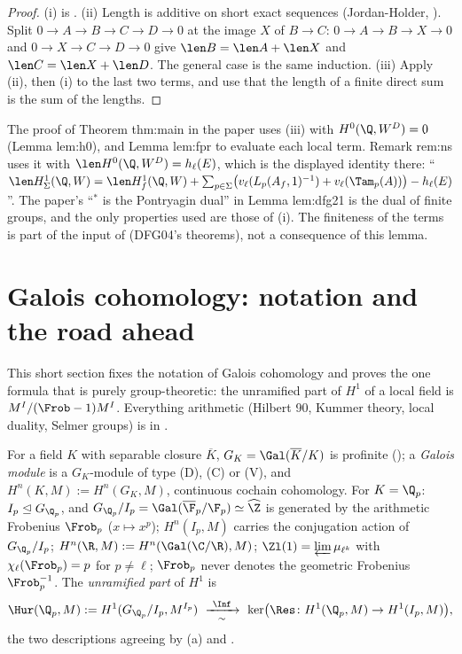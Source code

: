 \begin{proof}
(i) is . (ii) Length is additive on short exact sequences (Jordan-Holder, ). Split $0\to A\to B\to C\to D\to0$ at the image $X$ of $B\to C$:
$0\to A\to B\to X\to0$ and $0\to X\to C\to D\to0$ give $\len B=\len A+\len X$ and $\len C=\len X+\len D$. The general case is the same induction. (iii) Apply (ii), then (i) to the
last two terms, and use that the length of a finite direct sum is the sum of the lengths.
\end{proof}

\begin{paperlink}\label{pl:cohomology:lengths}
The proof of Theorem thm:main in the paper uses (iii) with $H^0(\Q,W^D)=0$ (Lemma lem:h0), and Lemma lem:fpr to evaluate each local term. Remark rem:ns uses it with
$\len H^0(\Q,W^D)=h_\ell(E)$, which is the displayed identity there: ``$\len H^1_\Sigma(\Q,W)=\len H^1_f(\Q,W)+\sum_{p\in\Sigma}\bigl(v_\ell(L_p(A_f,1)^{-1})+v_\ell(\Tam_p(A))\bigr)-h_\ell(E)$''. The paper's
``$^*$ is the Pontryagin dual'' in Lemma lem:dfg21 is the dual of finite groups, and the only properties used are those of (i). The finiteness of the terms is
part of the input of  (DFG04's theorems), not a consequence of this lemma.
\end{paperlink}

\section{Galois cohomology: notation and the road ahead}\label{sec:cohomology:galois}

This short section fixes the notation of Galois cohomology and proves the one formula that is purely group-theoretic: the unramified part of $H^1$ of a
local field is $M^{I}/(\Frob-1)M^I$. Everything arithmetic (Hilbert 90, Kummer theory, local duality, Selmer groups) is in .

\begin{convention}\label{conv:cohomology:galois}
For a field $K$ with separable closure $\overline K$, $G_K=\Gal(\overline K/K)$ is profinite (); a \emph{Galois module} is a $G_K$-module of type (D), (C) or
(V), and $H^n(K,M):=H^n(G_K,M)$, continuous cochain cohomology. For $K=\Q_p$: $I_p\trianglelefteq G_{\Q_p}$, and $G_{\Q_p}/I_p=\Gal(\overline\F_p/\F_p)\simeq\widehat\Z$ is generated by the
arithmetic Frobenius $\Frob_p$ ($x\mapsto x^p$); $H^n(I_p,M)$ carries the conjugation action of $G_{\Q_p}/I_p$; $H^n(\R,M):=H^n(\Gal(\C/\R),M)$; $\Zl(1)=\varprojlim\mu_{\ell^k}$
with $\chi_\ell(\Frob_p)=p$ for $p\ne\ell$; $\Frob_p$ never denotes the geometric Frobenius $\Frob_p^{-1}$. The \emph{unramified part} of $H^1$ is
\[
\Hur(\Q_p,M):=H^1(G_{\Q_p}/I_p,M^{I_p})\ \xrightarrow[\ \sim\ ]{\ \Inf\ }\ \ker\bigl(\Res\colon H^1(\Q_p,M)\to H^1(I_p,M)\bigr),
\]
the two descriptions agreeing by (a) and .
\end{convention}


